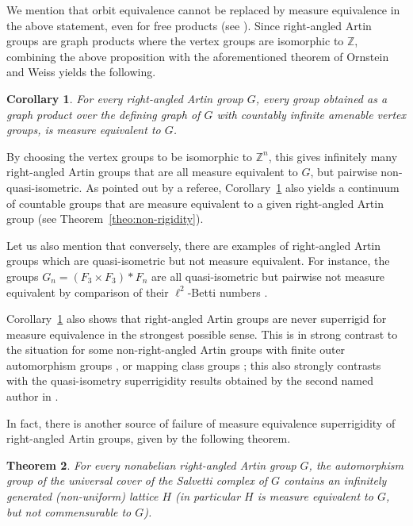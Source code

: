 \documentclass[11pt]{article}
\numberwithin{equation}{section}
\theoremstyle{plain}
\newtheorem{theointro}{Theorem}
\newtheorem{corintro}[theointro]{Corollary}
\theoremstyle{definition}
\begin{document}
We mention that orbit equivalence cannot be replaced by measure equivalence in the above statement, even for free products (see \cite[\S 2.2]{Gab}). Since right-angled Artin groups are graph products where the vertex groups are isomorphic to $\mathbb{Z}$, combining the above proposition with the aforementioned theorem of Ornstein and Weiss \cite{OW} yields the following.

\begin{corintro}\label{corintro:graph-products}
For every right-angled Artin group $G$, every group obtained as a graph product over the defining graph of $G$ with countably infinite amenable vertex groups, is measure equivalent to $G$.
\end{corintro}

By choosing the vertex groups to be isomorphic to $\mathbb{Z}^n$, this gives infinitely many right-angled Artin groups that are all measure equivalent to $G$, but pairwise non-quasi-isometric. As pointed out by a referee, Corollary~\ref{corintro:graph-products} also yields a continuum of countable groups that are measure equivalent to a given right-angled Artin group (see Theorem~\ref{theo:non-rigidity}).

Let us also mention that conversely, there are examples of right-angled Artin groups which are quasi-isometric but not measure equivalent. For instance, the groups $G_n=(F_3\times F_3)\ast F_n$ are all quasi-isometric \cite[Th.\,1.5]{Why} but pairwise not measure equivalent by comparison of their $\ell^2$-Betti numbers \cite[Cor.\,0.3]{Gab-betti}.

Corollary~\ref{corintro:graph-products} also shows that right-angled Artin groups are never superrigid for measure equivalence in the strongest possible sense. This is in strong contrast to the situation for some non-right-angled Artin groups with finite outer automorphism groups \cite{HH}, or mapping class groups \cite{Kid}; this also strongly contrasts with the quasi-isometry superrigidity results obtained by the second named author in \cite{Hua2}.

In fact, there is another source of failure of measure equivalence superrigidity of right-angled Artin groups, given by the following theorem.

\begin{theointro}\label{theointro-non-superrigid}
For every nonabelian right-angled Artin group $G$, the automorphism group of the universal cover of the Salvetti complex of $G$ contains an infinitely generated (non-uniform) lattice $H$ (in particular $H$ is measure equivalent to $G$, but not commensurable to $G$).
\end{theointro}
\end{document}
